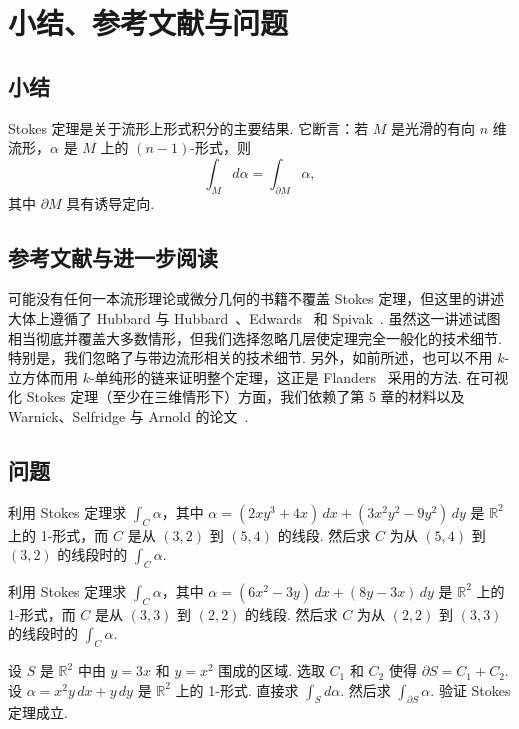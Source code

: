 \section{小结、参考文献与问题}

\subsection{小结}

Stokes 定理是关于流形上形式积分的主要结果. 它断言：若 $M$ 是光滑的有向 $n$ 维流形，$\alpha$ 是 $M$ 上的 $(n-1)$-形式，则
\[
\int_M d\alpha=\int_{\partial M}\alpha,
\]
其中 $\partial M$ 具有诱导定向.

\subsection{参考文献与进一步阅读}

可能没有任何一本流形理论或微分几何的书籍不覆盖 Stokes 定理，但这里的讲述大体上遵循了 Hubbard 与 Hubbard~\cite{ref27}、Edwards~\cite{ref17} 和 Spivak~\cite{ref40}. 虽然这一讲述试图相当彻底并覆盖大多数情形，但我们选择忽略几层使定理完全一般化的技术细节. 特别是，我们忽略了与带边流形相关的技术细节. 另外，如前所述，也可以不用 $k$-立方体而用 $k$-单纯形的链来证明整个定理，这正是 Flanders~\cite{ref19} 采用的方法. 在可视化 Stokes 定理（至少在三维情形下）方面，我们依赖了第 5 章的材料以及 Warnick、Selfridge 与 Arnold 的论文~\cite{ref49}.

\subsection{问题}

\begin{question}\label{q:11-24}
利用 Stokes 定理求 $\int_C\alpha$，其中 $\alpha=(2xy^3+4x)\,dx+(3x^2y^2-9y^2)\,dy$ 是 $\mathbb{R}^2$ 上的 1-形式，而 $C$ 是从 $(3,2)$ 到 $(5,4)$ 的线段. 然后求 $C$ 为从 $(5,4)$ 到 $(3,2)$ 的线段时的 $\int_C\alpha$.
\end{question}

\begin{question}\label{q:11-25}
利用 Stokes 定理求 $\int_C\alpha$，其中 $\alpha=(6x^2-3y)\,dx+(8y-3x)\,dy$ 是 $\mathbb{R}^2$ 上的 1-形式，而 $C$ 是从 $(3,3)$ 到 $(2,2)$ 的线段. 然后求 $C$ 为从 $(2,2)$ 到 $(3,3)$ 的线段时的 $\int_C\alpha$.
\end{question}

\begin{question}\label{q:11-26}
设 $S$ 是 $\mathbb{R}^2$ 中由 $y=3x$ 和 $y=x^2$ 围成的区域. 选取 $C_1$ 和 $C_2$ 使得 $\partial S=C_1+C_2$. 设 $\alpha=x^2y\,dx+y\,dy$ 是 $\mathbb{R}^2$ 上的 1-形式. 直接求 $\int_S d\alpha$. 然后求 $\int_{\partial S}\alpha$. 验证 Stokes 定理成立.
\end{question}

